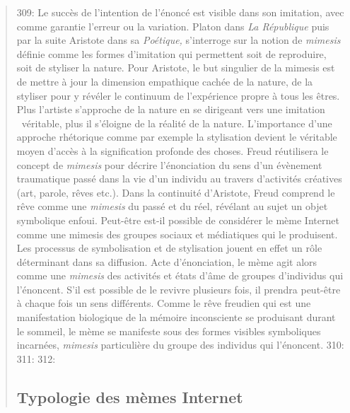\begin{quote}
309: Le succ\`es de l{\textquoteright}intention de l{\textquoteright}\'enonc\'e est visible dans son imitation, avec comme garantie l{\textquoteright}erreur ou la variation. Platon dans \textit{La R\'epublique} puis par la suite Aristote dans sa \textit{Po\'etique,} s{\textquoteright}interroge sur la notion de \textit{mimesis} d\'efinie comme les formes d{\textquoteright}imitation qui permettent soit de reproduire, soit de styliser la nature. Pour Aristote, le but singulier de la mimesis est de mettre \`a jour la dimension empathique cach\'ee de la nature, de la styliser pour y r\'ev\'eler le continuum de l{\textquoteright}exp\'erience propre \`a tous les \^etres. Plus l{\textquoteright}artiste s{\textquoteright}approche de la nature en se dirigeant vers une imitation {\guillemotleft}~v\'eritable{\guillemotright}, plus il s{\textquoteright}\'eloigne de la r\'ealit\'e de la nature. L{\textquoteright}importance d{\textquoteright}une approche rh\'etorique comme par exemple la stylisation devient le v\'eritable moyen d{\textquoteright}acc\`es \`a la signification profonde des choses. Freud r\'eutilisera le concept de \textit{mimesis} pour d\'ecrire l{\textquoteright}\'enonciation du sens d{\textquoteright}un \'ev\`enement traumatique pass\'e dans la vie d{\textquoteright}un individu au travers d{\textquoteright}activit\'es cr\'eatives (art, parole, r\^eves etc.). Dans la continuit\'e d{\textquoteright}Aristote, Freud comprend le r\^eve comme une \textit{mimesis} du pass\'e et du r\'eel, r\'ev\'elant au sujet un objet symbolique enfoui. Peut-\^etre est-il possible de consid\'erer le m\`eme Internet comme une mimesis des groupes sociaux et m\'ediatiques qui le produisent. Les processus de symbolisation et de stylisation jouent en effet un r\^ole d\'eterminant dans sa diffusion. Acte d{\textquoteright}\'enonciation, le m\`eme agit alors comme une \textit{mimesis} des activit\'es et \'etats d{\textquoteright}\^ame de groupes d{\textquoteright}individus qui l{\textquoteright}\'enoncent. S{\textquoteright}il est possible de le revivre plusieurs fois, il prendra peut-\^etre \`a chaque fois un sens diff\'erents. Comme le r\^eve freudien qui est une manifestation biologique de la m\'emoire inconsciente se produisant durant le sommeil, le m\`eme se manifeste sous des formes visibles symboliques incarn\'ees, \textit{mimesis} particuli\`ere du groupe des individus qui l{\textquoteright}\'enoncent. 
310: 
311: 
312: \subsection[Typologie des m\`emes Internet]{Typologie des m\`emes Internet}

\end{quote}
